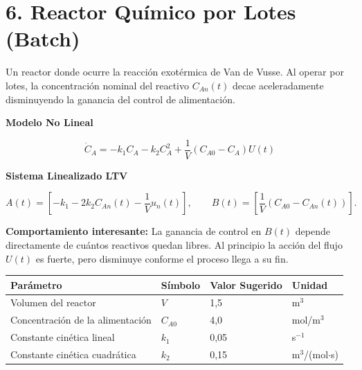 \documentclass{uofa-eng-assignment}
\begin{document}
\maketitle
\section*{6. Reactor Químico por Lotes (Batch)}

Un reactor donde ocurre la reacción exotérmica de Van de Vusse. Al operar por lotes, la concentración nominal del reactivo $C_{An}(t)$ decae aceleradamente disminuyendo la ganancia del control de alimentación.

\vspace{0.4cm}

\textbf{\large Modelo No Lineal}

\begin{equation}
\dot{C}_A
=
-k_1 C_A
-k_2 C_A^2
+\frac{1}{V}(C_{A0}-C_A)U(t)
\end{equation}

\vspace{0.3cm}

\textbf{\large Sistema Linealizado LTV}

\begin{equation}
A(t)=
\left[
-k_1
-2k_2 C_{An}(t)
-\frac{1}{V}u_n(t)
\right],
\qquad
B(t)=
\left[
\frac{1}{V}
\left(C_{A0}-C_{An}(t)\right)
\right].
\end{equation}

\vspace{0.3cm}

\textbf{Comportamiento interesante:}
La ganancia de control en $B(t)$ depende directamente de cuántos reactivos quedan libres. Al principio la acción del flujo $U(t)$ es fuerte, pero disminuye conforme el proceso llega a su fin.

\vspace{0.4cm}

\begin{center}
\begin{tabular}{llll}
\toprule
\textbf{Parámetro} & \textbf{Símbolo} & \textbf{Valor Sugerido} & \textbf{Unidad} \\
\midrule
Volumen del reactor & $V$ & 1,5 & m$^3$ \\
Concentración de la alimentación & $C_{A0}$ & 4,0 & mol/m$^3$ \\
Constante cinética lineal & $k_1$ & 0,05 & s$^{-1}$ \\
Constante cinética cuadrática & $k_2$ & 0,15 & m$^3$/(mol$\cdot$s) \\
\bottomrule
\end{tabular}
\end{center}
\end{document}
